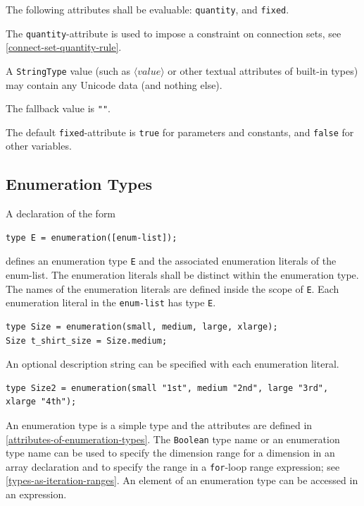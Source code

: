 The following attributes shall be evaluable: \lstinline!quantity!, and \lstinline!fixed!.

The \lstinline!quantity!-attribute is used to impose a constraint on connection sets, see \cref{connect-set-quantity-rule}.

A \lstinline!StringType! value (such as $\langle\mathit{value}\rangle$ or other textual attributes of built-in types) may contain any Unicode data (and nothing else).

The fallback value is \lstinline!""!.

The default \lstinline!fixed!-attribute is \lstinline!true! for parameters and constants, and \lstinline!false! for other variables.

\subsection{Enumeration Types}\label{enumeration-types}

A declaration of the form
\begin{lstlisting}[language=modelica]
type E = enumeration([enum-list]);
\end{lstlisting}%
defines an enumeration type \lstinline!E! and the associated enumeration literals of the enum-list.
The enumeration literals shall be distinct within the enumeration type.
The names of the enumeration literals are defined inside the scope of \lstinline!E!.
Each enumeration literal in the \lstinline!enum-list! has type \lstinline!E!.

\begin{example}
\begin{lstlisting}[language=modelica]
type Size = enumeration(small, medium, large, xlarge);
Size t_shirt_size = Size.medium;
\end{lstlisting}
\end{example}

An optional description string can be specified with each enumeration literal.

\begin{example}
\begin{lstlisting}[language=modelica]
type Size2 = enumeration(small "1st", medium "2nd", large "3rd", xlarge "4th");
\end{lstlisting}
\end{example}

An enumeration type is a simple type and the attributes are defined in \cref{attributes-of-enumeration-types}.
The \lstinline!Boolean! type name or an enumeration type name can be used to specify the dimension range for a dimension in an array declaration and to specify the range in a \lstinline!for!-loop range expression; see \cref{types-as-iteration-ranges}.
An element of an enumeration type can be accessed in an expression.

